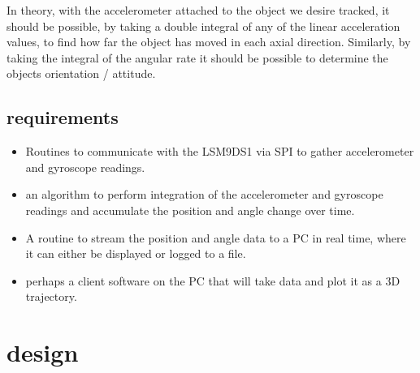 \documentclass[10pt, a4paper]{article}
\begin{document}
In theory, with the accelerometer attached to the object we desire tracked, it should be possible, by taking a double integral of any of the linear acceleration values, to find how far the object has moved in each axial direction. Similarly, by taking the integral of the angular rate it should be possible to determine the objects orientation / attitude.

\subsection{requirements}

\begin{itemize}
    \item Routines to communicate with the LSM9DS1 via SPI to gather accelerometer and gyroscope readings.
    \item an algorithm to perform integration of the accelerometer and gyroscope readings and accumulate the position and angle change over time.
    \item A routine to stream the position and angle data to a PC in real time, where it can either be displayed or logged to a file.
    \item perhaps a client software on the PC that will take data and plot it as a 3D trajectory.
\end{itemize}

\section{design}
\end{document}
